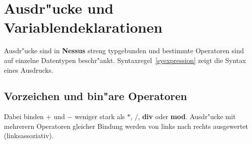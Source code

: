 \chapter{Ausdr"ucke und Variablendeklarationen}
\label{EinfacheAusdruecke}
\label{LogischeAusdruecke}


Ausdr"ucke sind in {\bf Nessus} streng typgebunden und bestimmte
Operatoren sind auf einzelne Datentypen beschr"ankt.
Syntaxregel~\ref{syexpression} zeigt die Syntax eines Ausdrucks.

\section{Vorzeichen und bin"are Operatoren}
\label{numExpr}

\begin{center}
\end{center}


Dabei binden $+$ und $-$  weniger stark
als $*$, $/$, {\bf div} oder {\bf mod}. Ausdr"ucke mit
mehrerern Operatoren gleicher Bindung werden von links nach rechts
ausgewertet (linksassoziativ).

